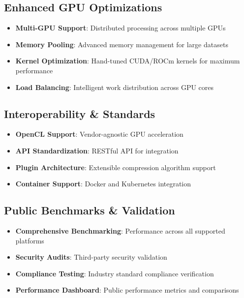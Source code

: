 \documentclass[12pt,a4paper]{article}
\begin{document}
\subsection{Enhanced GPU Optimizations}
\begin{itemize}
    \item \textbf{Multi-GPU Support}: Distributed processing across multiple GPUs
    \item \textbf{Memory Pooling}: Advanced memory management for large datasets
    \item \textbf{Kernel Optimization}: Hand-tuned CUDA/ROCm kernels for maximum performance
    \item \textbf{Load Balancing}: Intelligent work distribution across GPU cores
\end{itemize}

\subsection{Interoperability \& Standards}
\begin{itemize}
    \item \textbf{OpenCL Support}: Vendor-agnostic GPU acceleration
    \item \textbf{API Standardization}: RESTful API for integration
    \item \textbf{Plugin Architecture}: Extensible compression algorithm support
    \item \textbf{Container Support}: Docker and Kubernetes integration
\end{itemize}

\subsection{Public Benchmarks \& Validation}
\begin{itemize}
    \item \textbf{Comprehensive Benchmarking}: Performance across all supported platforms
    \item \textbf{Security Audits}: Third-party security validation
    \item \textbf{Compliance Testing}: Industry standard compliance verification
    \item \textbf{Performance Dashboard}: Public performance metrics and comparisons
\end{itemize}

\end{document}
